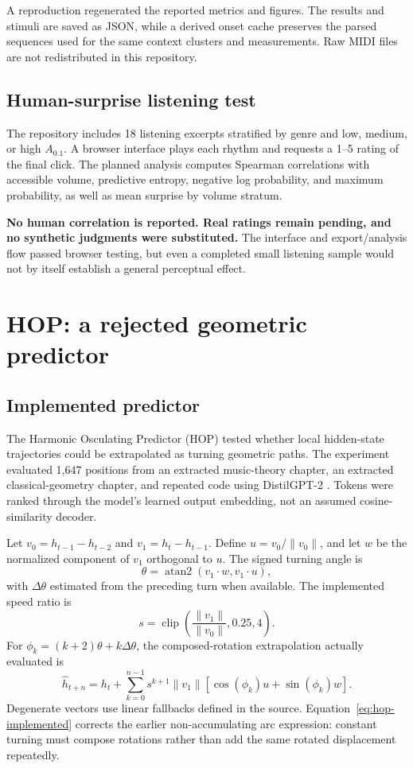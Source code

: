 \documentclass[11pt,a4paper]{article}
\begin{document}
A reproduction regenerated the reported metrics and figures. The results and stimuli are saved as JSON, while a derived onset cache preserves the parsed sequences used for the same context clusters and measurements. Raw MIDI files are not redistributed in this repository.

\subsection{Human-surprise listening test}
The repository includes 18 listening excerpts stratified by genre and low, medium, or high $A_{0.1}$. A browser interface plays each rhythm and requests a 1--5 rating of the final click. The planned analysis computes Spearman correlations with accessible volume, predictive entropy, negative log probability, and maximum probability, as well as mean surprise by volume stratum.

\textbf{No human correlation is reported. Real ratings remain pending, and no synthetic judgments were substituted.} The interface and export/analysis flow passed browser testing, but even a completed small listening sample would not by itself establish a general perceptual effect.

\section{HOP: a rejected geometric predictor}
\subsection{Implemented predictor}
The Harmonic Osculating Predictor (HOP) tested whether local hidden-state trajectories could be extrapolated as turning geometric paths. The experiment evaluated 1,647 positions from an extracted music-theory chapter, an extracted classical-geometry chapter, and repeated code using DistilGPT-2 \cite{distilgpt2}. Tokens were ranked through the model's learned output embedding, not an assumed cosine-similarity decoder.

Let $v_0=h_{t-1}-h_{t-2}$ and $v_1=h_t-h_{t-1}$. Define $u=v_0/\lVert v_0\rVert$, and let $w$ be the normalized component of $v_1$ orthogonal to $u$. The signed turning angle is
\begin{equation}
\theta=\operatorname{atan2}(v_1\cdot w,v_1\cdot u),
\end{equation}
with $\Delta\theta$ estimated from the preceding turn when available. The implemented speed ratio is
\begin{equation}
s=\operatorname{clip}\!\left(\frac{\lVert v_1\rVert}{\lVert v_0\rVert},0.25,4\right).
\end{equation}
For $\phi_k=(k+2)\theta+k\Delta\theta$, the composed-rotation extrapolation actually evaluated is
\begin{equation}
\hat h_{t+n}=h_t+\sum_{k=0}^{n-1}s^{k+1}\lVert v_1\rVert
\left[\cos(\phi_k)u+\sin(\phi_k)w\right].
\label{eq:hop-implemented}
\end{equation}
Degenerate vectors use linear fallbacks defined in the source. Equation~\ref{eq:hop-implemented} corrects the earlier non-accumulating arc expression: constant turning must compose rotations rather than add the same rotated displacement repeatedly.
\end{document}
